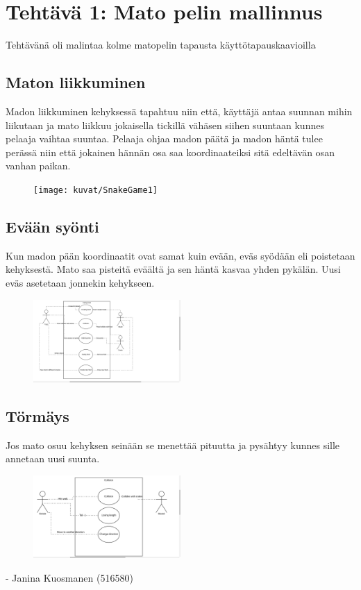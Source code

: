
\chapter{Tehtävä 1: Mato pelin mallinnus \label{chap:Teht=0000E4v=0000E4-1}}


Tehtävänä oli malintaa kolme matopelin tapausta käyttötapauskaavioilla
\section{Maton liikkuminen}

\label{Madon liikkuminen}

Madon liikkuminen kehyksessä tapahtuu niin että, käyttäjä antaa suunnan mihin liikutaan ja mato liikkuu jokaisella 
tickillä vähäsen siihen suuntaan kunnes pelaaja vaihtaa suuntaa. Pelaaja ohjaa madon päätä ja madon häntä tulee perässä
niin että jokainen hännän osa saa koordinaateiksi sitä edeltävän osan vanhan paikan.

\begin{figure}
\centering \texttt{[image: kuvat/SnakeGame1]}
\label{Liikkuminen} 
\end{figure}

\section{Evään syönti}
\label{Evään syönti}
Kun madon pään koordinaatit ovat samat kuin evään, eväs syödään eli poistetaan kehyksestä. Mato saa pisteitä eväältä ja sen häntä kasvaa yhden pykälän. Uusi eväs asetetaan jonnekin kehykseen. 

\begin{figure}
\centering \includegraphics[width=0.5\textwidth]{kuvat/SnakeGame2}
\label{Syönti} 
\end{figure}
\section{Törmäys}
\label{Törmäys}
Jos mato osuu kehyksen seinään se menettää pituutta ja pysähtyy kunnes sille annetaan uusi suunta. 
\begin{figure}
\centering \includegraphics[width=0.5\textwidth]{kuvat/SnakeGame3}
\label{törmäysSeinään} 
\end{figure}




- Janina Kuosmanen (516580)
